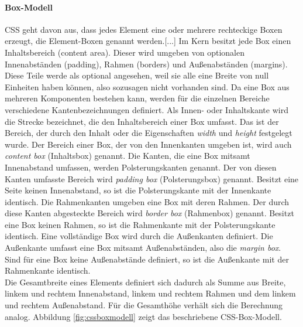 \documentclass[12pt,a4paper,bibliography=totocnumbered,listof=totocnumbered]{scrartcl}
\begin{document}
\paragraph{Box-Modell} \glqq CSS geht davon aus, dass jedes Element eine oder mehrere rechteckige Boxen erzeugt, die Element-Boxen genannt werden.[...] Im Kern besitzt jede Box einen Inhaltsbereich (content area). Dieser wird umgeben von optionalen Innenabständen (padding), Rahmen (borders) und Außenabständen (margins). Diese Teile werde als optional angesehen, weil sie alle eine Breite von null Einheiten haben können, also sozusagen nicht vorhanden sind.\grqq{}\cite[S.167]{MeyeCasc2005} \glqq Da eine Box aus mehreren Komponenten bestehen kann, werden für die einzelnen Bereiche verschiedene Kantenbezeichnungen definiert. Als Innen- oder Inhaltskante wird die Strecke bezeichnet, die den Inhaltsbereich einer Box umfasst. Das ist der Bereich, der durch den Inhalt oder die Eigenschaften \textit{width} und \textit{height} festgelegt wurde. Der Bereich einer Box, der von den Innenkanten umgeben ist, wird auch \textit{content box} (Inhaltsbox) genannt. Die Kanten, die eine Box mitsamt Innenabstand umfassen, werden Polsterungskanten genannt. Der von diesen Kanten umfasste Bereich wird \textit{padding box} (Polsterungsbox) genannt. Besitzt eine Seite keinen Innenabstand, so ist die Polsterungskante mit der Innenkante identisch. Die Rahmenkanten umgeben eine Box mit deren Rahmen. Der durch diese Kanten abgesteckte Bereich wird \textit{border box} (Rahmenbox) genannt. Besitzt eine Box keinen Rahmen, so ist die Rahmenkante mit der Polsterungskante identisch. Eine vollständige Box wird durch die Außenkanten definiert. Die Außenkante umfasst eine Box mitsamt Außenabständen, also die \textit{margin box}. Sind für eine Box keine Außenabstände definiert, so ist die Außenkante mit der Rahmenkante identisch.\grqq{}\cite{SelfHtml20145}\\Die Gesamtbreite eines Elements definiert sich dadurch als Summe aus Breite, linkem und rechtem Innenabstand, linkem und rechtem Rahmen und dem linkem und rechtem Außenabstand. Für die Gesamthöhe verhält sich die Berechnung analog. Abbildung \ref{fig:cssboxmodell} zeigt das beschriebene CSS-Box-Modell.
\end{document}

